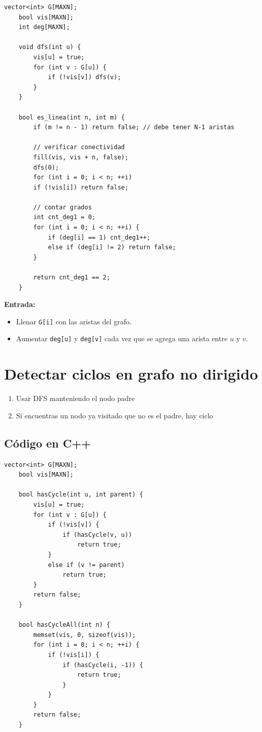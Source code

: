 \begin{lstlisting}[caption=Verificar si un grafo es una línea]
	vector<int> G[MAXN];
	bool vis[MAXN];
	int deg[MAXN];
	
	void dfs(int u) {
		vis[u] = true;
		for (int v : G[u]) {
			if (!vis[v]) dfs(v);
		}
	}
	
	bool es_linea(int n, int m) {
		if (m != n - 1) return false; // debe tener N-1 aristas
		
		// verificar conectividad
		fill(vis, vis + n, false);
		dfs(0);
		for (int i = 0; i < n; ++i)
		if (!vis[i]) return false;
		
		// contar grados
		int cnt_deg1 = 0;
		for (int i = 0; i < n; ++i) {
			if (deg[i] == 1) cnt_deg1++;
			else if (deg[i] != 2) return false;
		}
		
		return cnt_deg1 == 2;
	}
\end{lstlisting}

\textbf{Entrada:}
\begin{itemize}
	\item Llenar \texttt{G[i]} con las aristas del grafo.
	\item Aumentar \texttt{deg[u]} y \texttt{deg[v]} cada vez que se agrega una arista entre \( u \) y \( v \).
\end{itemize}
		
\section{Detectar ciclos en grafo no dirigido}

\begin{enumerate}
	\item Usar DFS manteniendo el nodo padre
	\item Si encuentras un nodo ya visitado que no es el padre, hay ciclo
\end{enumerate}

\subsection*{Código en C++}

\begin{lstlisting}[caption=Detectar ciclos en grafo no dirigido]
	vector<int> G[MAXN];
	bool vis[MAXN];
	
	bool hasCycle(int u, int parent) {
		vis[u] = true;
		for (int v : G[u]) {
			if (!vis[v]) {
				if (hasCycle(v, u)) 
					return true;
			}
			else if (v != parent) 
				return true;
		}
		return false;
	}
	
	bool hasCycleAll(int n) {
		memset(vis, 0, sizeof(vis));
		for (int i = 0; i < n; ++i) {
			if (!vis[i]) {
				if (hasCycle(i, -1)) {
					return true;
				}
			}
		}
		return false;
	}
\end{lstlisting}

